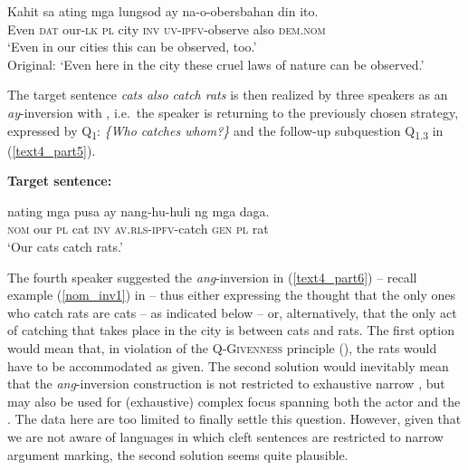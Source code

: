 \documentclass[output=paper,
,modfonts
,nonflat]{langsci/langscibook}
\begin{document}
\largerpage[2]
\begin{exe}
\ex\label{text4_part4}
\begin{xlist}
\end{xlist}
\begin{xlist}[{>}>{>}> A\textsubscript{{3}}:]
\gll Kahit {{\ob}{\ob}sa} ating mga {lungsod{\cb}\focus} ay na-o-obersbahan din {{\ob}ito{\cb}\topic.{\cb}\sq}\\
Even \textsc{\void{[[}dat} our-\textsc{lk} \textsc{pl} city \textsc{inv} \textsc{uv-ipfv}-observe also \textsc{\void{[}dem.nom}\\
\glt `Even in our cities this can be observed, too.'\\
Original: `Even here in the city these cruel laws of nature can be observed.'
\end{xlist}
\end{exe}
 
\newpage  
\noindent The target sentence \textit{cats also catch rats} is then realized by three speakers as an \textit{ay}-inversion with , i.e.\ the speaker is returning to the previously chosen  strategy, expressed by Q\textsubscript{1}: \textit{\{Who catches whom?\}} and the follow-up subquestion Q\textsubscript{{1.3}} in (\ref{text4_part5}). 

\begin{exe}
\ex\label{text4_part5}\textbf{Target sentence:}
\begin{xlist}
\end{xlist}
\begin{xlist}[{>}>{>}> A\textsubscript{{1.3}}:]
 nating mga {pusa{\cb}\ctopic} ay  nang-hu-huli {{\ob}ng} mga {daga{\cb}\focus{\cb}\sq}.\\ 
\textsc{\void{[[}nom} our \textsc{pl} cat \textsc{inv} \textsc{av.rls-ipfv}-catch \textsc{\void{[}gen} \textsc{pl} rat\\
\glt `Our cats catch rats.'
\end{xlist}
\end{exe}

\noindent The fourth speaker suggested the \textit{ang}-inversion in (\ref{text4_part6}) -- recall example (\ref{nom_inv1}) in  -- thus either expressing the thought that the only ones who catch rats are cats -- as indicated below -- or, alternatively, that the only act of catching that takes place in the city is between cats and rats. The first option would mean that, in violation of the \textsc{Q-Givenness} principle (), the rats would have to be accommodated as given. The second solution would inevitably mean that the \textit{ang}-inversion construction is not restricted to exhaustive narrow , but may also be used for (exhaustive) complex focus spanning both the actor and the . The data here are too limited to finally settle this question. However, given that we are not aware of languages in which cleft sentences are restricted to narrow argument marking, the second solution seems quite plausible.
\end{document}
